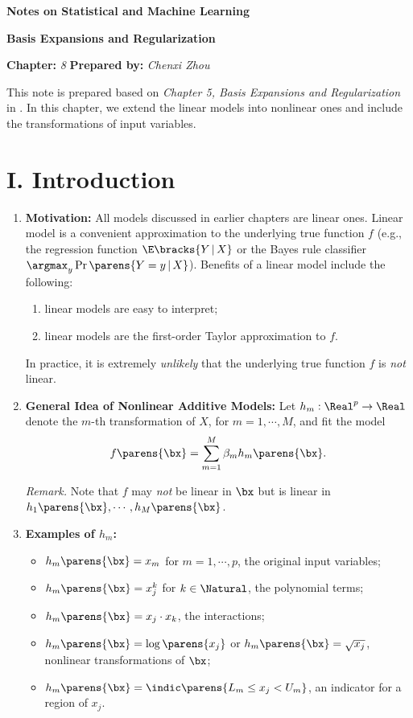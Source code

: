 \documentclass[12pt]{article}
\newcommand{\titlebox}[4]{
\begin{tcolorbox}[colback = blue!5!white!95, colframe = blue!70!black
]
  \noindent \textbf{ #1 } \hfill \textit{#2} 
  \begin{center}
  	 \LARGE{\textbf{#3}}
  \end{center}
\textbf{Chapter:} \textit{#4} \hfill \textbf{Prepared by:} \textit{Chenxi Zhou}
\end{tcolorbox}
}
\begin{document}
\titlebox{Notes on Statistical and Machine Learning}{}{Basis Expansions and Regularization}{8}
\thispagestyle{plain}

\vspace{10pt}

This note is prepared based on \textit{Chapter 5, Basis Expansions and Regularization} in \textcite{Friedman2001-np}. In this chapter, we extend the linear models into nonlinear ones and include the transformations of input variables. 

\section*{I. Introduction}

\begin{enumerate}[label=\textbf{\arabic*.}]

	\item \textbf{Motivation:} All models discussed in earlier chapters are linear ones. Linear model is a convenient approximation to the underlying true function $f$ (e.g., the regression function $\E \bracks{Y \,\vert\, X}$ or the Bayes rule classifier $\argmax_{y} \Pr \parens{Y = y \,\vert\, X}$). Benefits of a linear model include the following: 
	\begin{enumerate}
		\item linear models are easy to interpret; 
		\item linear models are the first-order Taylor approximation to $f$. 
	\end{enumerate}
	In practice, it is extremely \emph{unlikely} that the underlying true function $f$ is \emph{not} linear. 
	
	\item \textbf{General Idea of Nonlinear Additive Models:} Let $h_m: \Real^p \to \Real$ denote the $m$-th transformation of $X$, for $m = 1, \cdots, M$, and fit the model 
	\begin{align*}
		f \parens{\bx} = \sum_{m=1}^M \beta_m h_m \parens{\bx}. 
	\end{align*}
	
	\textit{Remark.} Note that $f$ may \emph{not} be linear in $\bx$ but is linear in $h_1 \parens{\bx}, \cdots, h_M \parens{\bx}$. 

	\item \textbf{Examples of $h_m$:}
	\begin{itemize}
		\item $h_m \parens{\bx} = x_m$ for $m = 1, \cdots, p$, the original input variables; 
		\item $h_m \parens{\bx} = x_j^k$ for $k \in \Natural$, the polynomial terms; 
		\item $h_m \parens{\bx} = x_j \cdot x_k$, the interactions; 
		\item $h_m \parens{\bx} = \log \parens{x_j}$ or $h_m \parens{\bx} = \sqrt{x_j}$, nonlinear transformations of $\bx$; 
		\item $h_m \parens{\bx} = \indic \parens{L_m \le x_j < U_m}$, an indicator for a region of $x_j$. 
	\end{itemize}
	

\end{enumerate}
\end{document}
